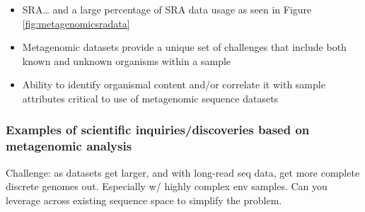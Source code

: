 \begin{itemize}
    \item SRA… and a large percentage of SRA data usage as seen in Figure \ref{fig:metagenomicsradata}
    \item Metagenomic datasets provide a unique set of challenges that include both known and unknown organisms within a sample
    \item Ability to identify organismal content and/or correlate it with sample attributes critical to use of metagenomic sequence datasets

\end{itemize}

\subsubsection{Examples of scientific inquiries/discoveries based on metagenomic analysis}
\label{sec:ExamplesOfMetadatAnalysis}

Challenge: as datasets get larger, and with long-read seq data, get more complete discrete genomes out. Especially w/ highly complex env samples. Can you leverage across existing sequence space to simplify the problem.



